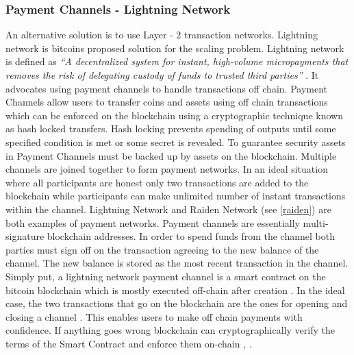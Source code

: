 \subsubsection{Payment Channels - Lightning Network} \label{LN}
An alternative solution is to use Layer - 2 transaction networks. Lightning network is bitcoins proposed solution for the scaling problem. Lightning network is defined as \textit{“A decentralized system for instant, high-volume micropayments that removes the risk of delegating custody of funds to trusted third parties”} \cite{paper:002}. It advocates using payment channels to handle transactions off chain. Payment Channels allow users to transfer coins and assets using off chain transactions which can be enforced on the blockchain using a cryptographic technique known as hash locked transfers. Hash locking prevents spending of outputs until some specified condition is met or some secret is revealed.  To guarantee security assets in Payment Channels must be backed up by assets on the blockchain. Multiple channels are joined together to form payment networks. In an ideal situation where all participants are honest only two transactions are added to the blockchain while participants can make unlimited number of instant transactions within the channel. Lightning Network and Raiden Network (see \ref{raiden}) are both examples of payment networks. Payment channels are essentially multi-signature blockchain addresses. In order to spend funds from the channel both parties must sign off on the transaction agreeing to the new balance of the channel. The new balance is stored as the most recent transaction in the channel. Simply put, a lightning network payment channel is a smart contract on the bitcoin blockchain which is mostly executed off-chain after creation \cite{misc:011}. In the ideal case, the two transactions that go on the blockchain are the ones for opening and closing a channel \cite{misc:011}. This enables users to make off chain payments with confidence. If anything goes wrong blockchain can cryptographically verify the terms of the Smart Contract and enforce them on-chain \cite{misc:012}, \cite{paper:002}.  
\vspace{0.5cm}  
